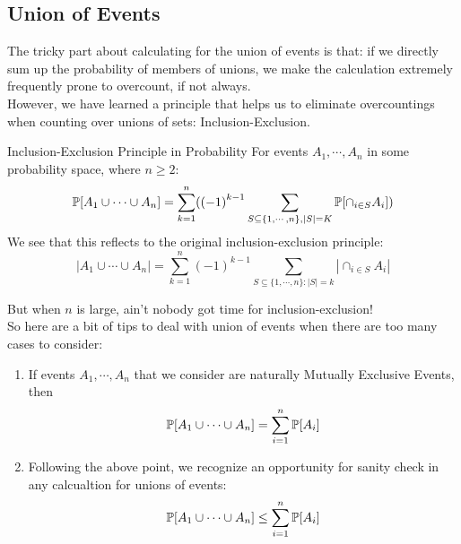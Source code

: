 \subsection{Union of Events}
The tricky part about calculating for the union of events is that: if we directly sum up the probability of members of unions, we make the calculation extremely frequently prone to overcount, if not always. \\
However, we have learned a principle that helps us to eliminate overcountings when counting over unions of sets: Inclusion-Exclusion.
\begin{ln-define}{Inclusion-Exclusion Principle in Probability}{}
    For events $A_1, \cdots, A_n$ in some probability space, where $n \geq 2$:
    \[\P[A_1 \cup \cdots \cup A_n] = \sum_{k = 1}^n ({(-1)}^{k - 1} \sum_{S \subseteq \{1, \cdots, n\}, |S| = K} \P[\cap_{i \in S} A_i])\]
    We see that this reflects to the original inclusion-exclusion principle:
    \[|A_1 \cup \cdots \cup A_n| = \sum_{k = 1}^n {(-1)}^{k - 1} \sum_{S \subseteq \{1, \cdots, n\}:|S| = k} |\cap_{i \in S}A_i|\]
\end{ln-define}

But when $n$ is large, ain't nobody got time for inclusion-exclusion! \\
So here are a bit of tips to deal with union of events when there are too many cases to consider:
\begin{enumerate}
    \item If events $A_1, \cdots, A_n$ that we consider are naturally Mutually Exclusive Events, then \[\P[A_1 \cup \cdots \cup A_n] = \sum_{i = 1}^n \P[A_i]\]
    \item Following the above point, we recognize an opportunity for sanity check in any calcualtion for unions of events:  \[\P[A_1 \cup \cdots \cup A_n] \leq \sum_{i = 1}^n \P[A_i]\]
\end{enumerate}
